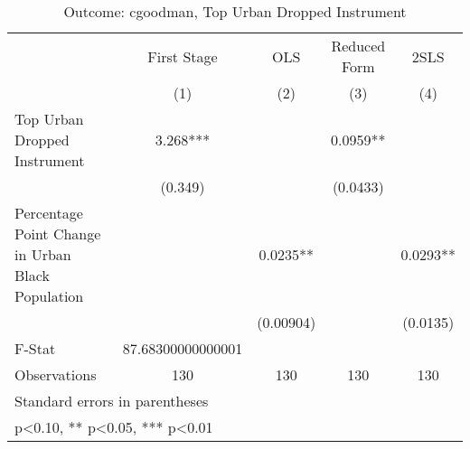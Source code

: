 \begin{table}[htbp]\centering
\def\sym#1{\ifmmode^{#1}\else\(^{#1}\)\fi}
\caption{Outcome: cgoodman, Top Urban Dropped Instrument}
\begin{tabular}{l*{4}{c}}
\toprule
                    & First Stage   &         OLS   &Reduced Form   &        2SLS   \\
                    &\multicolumn{1}{c}{(1)}   &\multicolumn{1}{c}{(2)}   &\multicolumn{1}{c}{(3)}   &\multicolumn{1}{c}{(4)}   \\
\midrule
Top Urban Dropped Instrument&       3.268***&               &      0.0959** &               \\
                    &     (0.349)   &               &    (0.0433)   &               \\
\addlinespace
Percentage Point Change in Urban Black Population&               &      0.0235** &               &      0.0293** \\
                    &               &   (0.00904)   &               &    (0.0135)   \\
\midrule
F-Stat              &87.68300000000001   &               &               &               \\
Observations        &         130   &         130   &         130   &         130   \\
\bottomrule
\multicolumn{5}{l}{\footnotesize Standard errors in parentheses}\\
\multicolumn{5}{l}{\footnotesize * p<0.10, ** p<0.05, *** p<0.01}\\
\end{tabular}
\end{table}
